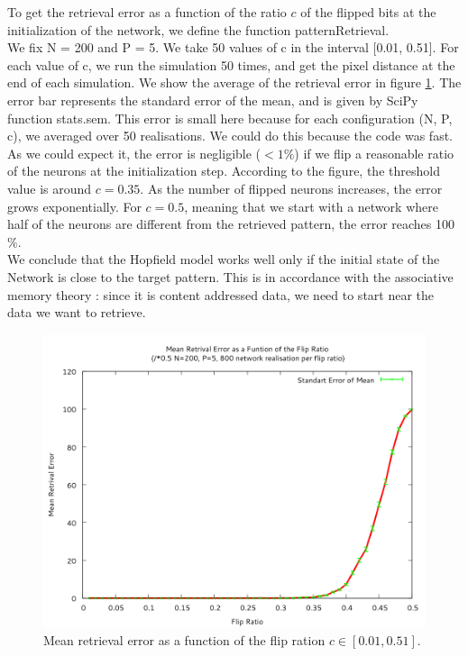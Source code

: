 To get the retrieval error as a function of the ratio $c$ of the flipped bits at the initialization of the network, we define the function patternRetrieval. \\
We fix N = 200 and P = 5. We take 50 values of c in the interval [0.01, 0.51]. For each value of c, we run the simulation 50 times, and get the pixel distance 
at the end of each simulation. We show the average of the retrieval error in figure \ref{reterr}. 
The error bar represents the standard error of the mean, and is given by SciPy function stats.sem. This error is small here because for each configuration
(N, P, c), we averaged over 50 realisations. We could do this because the code was fast.\\
As we could expect it, the error is negligible ($<1\%$) if we flip a reasonable 
ratio of the neurons at the initialization step. According to the figure, the threshold value is around $c = 0.35$. As the number of flipped neurons increases, the error grows exponentially. 
For $c=0.5$, meaning that we start with a network where half of the neurons are different from the retrieved pattern, the error reaches 100$\%$. \\
We conclude that the Hopfield model works well only if the initial state of the Network is close to the target pattern. This is in accordance with the 
associative memory theory : since it is content addressed data, we need to start near the data we want to retrieve.
\begin{center}
    \begin{figure}\label{reterr}
    \caption{Mean retrieval error as a function of the flip ration $c\in[0.01, 0.51]$.  }
    \includegraphics[scale=0.7]{img/ex11.png}
    \end{figure}
\end{center}

